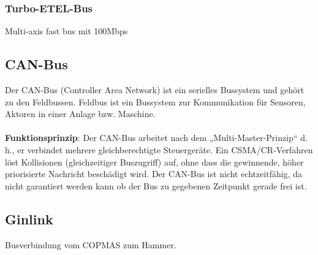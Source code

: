		\subsubsection{Turbo-ETEL-Bus}
			Multi-axis fast bus mit 100Mbps
	\subsection{CAN-Bus}
		Der CAN-Bus (Controller Area Network) ist ein serielles Bussystem und gehört zu den Feldbussen. Feldbus ist ein Bussystem zur Kommunikation für Sensoren, Aktoren in einer Anlage bzw. Maschine.\\\\
		\textbf{Funktionsprinzip}: Der CAN-Bus arbeitet nach dem „Multi-Master-Prinzip“ d. h., er verbindet mehrere gleichberechtigte Steuergeräte. Ein CSMA/CR-Verfahren löst Kollisionen (gleichzeitiger Buszugriff) auf, ohne dass die gewinnende, höher priorisierte Nachricht beschädigt wird. Der CAN-Bus ist nicht echtzeitfähig, da nicht garantiert werden kann ob der Bus zu gegebenen Zeitpunkt gerade frei ist.
	\subsection{Ginlink}
		Busverbindung vom COPMAS zum Hammer.